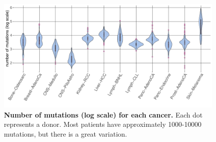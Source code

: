 \begin{figure}[ht!]
    \centering
    \includegraphics[scale=0.66]{graphics/mutation_summary.pdf}
    \caption{\textbf{Number of mutations (log scale) for each cancer.} Each dot represents a donor. Most patients have approximately 1000-10000 mutations, but there is a great variation.}
    \label{fig:mutation_summary}
\end{figure}
